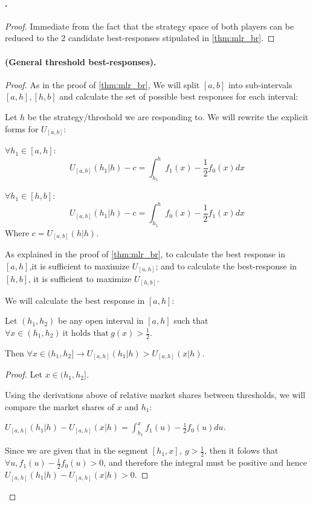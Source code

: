 \paragraph{.}
\begin{proof}
    Immediate from the fact that the strategy space of both players can be reduced to the 2 candidate best-responses stipulated in \cref{thm:mlr_br}.
\end{proof}
\paragraph{ (General threshold best-responses).}
\begin{proof}
As in the proof of \cref{thm:mlr_br}, We will split $[a,b]$ into sub-intervals $[a,h] , [h,b]$ and calculate the set of possible best responses for each interval:

Let $h$ be the strategy/threshold we are responding to.
We will rewrite the explicit forms for $U_{[a,b]}$:

$\forall h_1 \in [a,h]$: $$U_{[a,b]}(h_1|h) -  c = \int_{h_1}^h f_1(x) - \frac{1}{2}f_0(x) dx$$

$\forall h_1 \in [h,b]$: $$U_{[a,b]}(h_1|h) -  c = \int_{h_1}^h f_0(x) - \frac{1}{2}f_1(x) dx$$
Where $c  = U_{[a,b]}(h|h)$.

As explained in the proof of \cref{thm:mlr_br}, to calculate the best response in $[a,h]$,it is sufficient to maximize $U_{[a,h]}$; and to calculate the best-response in $[h,b]$, it is sufficient to maximize $U_{[h,b]}$.

We will calculate the best response in $[a,h]$:
\begin{helpful_claim}
\label{hc:outside_interval_br_left}
    Let $(h_1, h_2)$ be any open interval in $[a,h]$ such that $\forall x \in (h_1,h_2) \ \text{it holds that} \ g(x) > \frac{1}{2}$.
    
    Then $\forall x \in (h_1, h_2] \to U_{[a,h]}(h_1|h) > U_{[a,h]}(x|h)$.
\end{helpful_claim}
 \begin{proof}
    Let  $x \in (h_1, h_2]$.
    
     Using the derivations above of relative market shares between thresholds, we will compare the market shares of $x$ and $h_1$:

     $U_{[a,h]}(h_1|h) - U_{[a,h]}(x|h) = \int_{h_1}^x f_1(u) - \frac{1}{2}f_0(u) du$.

    Since we are given that in the segment $[h_1,x], \ g > \frac{1}{2}$, then it folows that $\forall u, f_1(u) - \frac{1}{2}f_0(u) > 0$, and therefore the integral must be positive and hence $U_{[a,h]}(h_1|h) - U_{[a,h]}(x|h) > 0$.
     

\end{proof}
\end{proof}
